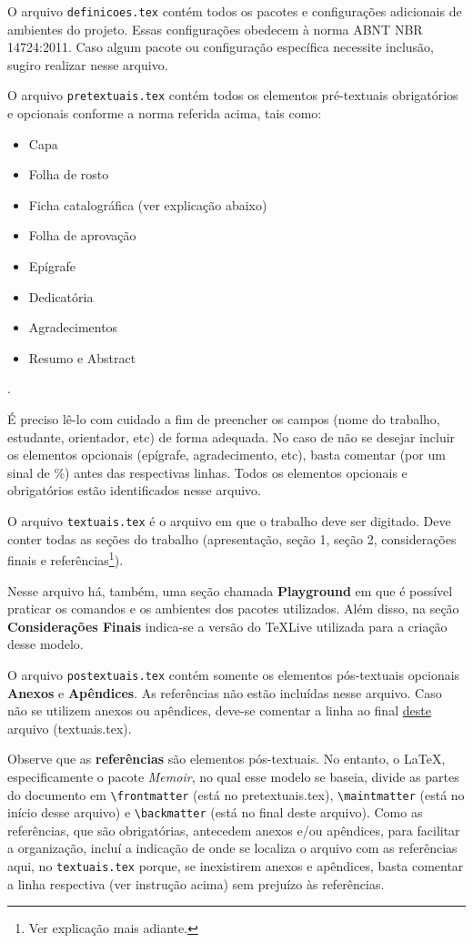 \documentclass[a4paper,12pt,oneside,openright,extrafontsizes,openbib]{memoir}
\begin{document}
{O arquivo \verb|definicoes.tex| contém todos os pacotes e configurações adicionais de ambientes do projeto. Essas configurações obedecem à norma ABNT NBR 14724:2011. Caso algum pacote ou configuração específica necessite inclusão, sugiro realizar nesse arquivo.

O arquivo \verb|pretextuais.tex| contém todos os elementos pré-textuais obrigatórios e opcionais conforme a norma referida acima, tais como:

\begin{itemize}
	\item Capa
	\item Folha de rosto
	\item Ficha catalográfica (ver explicação abaixo)
	\item Folha de aprovação
	\item Epígrafe
	\item Dedicatória
	\item Agradecimentos
	\item Resumo e Abstract
\end{itemize}. 

É preciso lê-lo com cuidado a fim de preencher os campos (nome do trabalho, estudante, orientador, etc) de forma adequada. No caso de não se desejar incluir os elementos opcionais (epígrafe, agradecimento, etc), basta comentar (por um sinal de \%) antes das respectivas linhas. Todos os elementos opcionais e obrigatórios estão identificados nesse arquivo.

O arquivo \verb|textuais.tex| é o arquivo em que o trabalho deve ser digitado. Deve conter todas as seções do trabalho (apresentação, seção 1, seção 2, considerações finais e referências\footnote{Ver explicação mais adiante.}).

Nesse arquivo há, também, uma seção chamada \textbf{Playground} em que é possível praticar os comandos e os ambientes dos pacotes utilizados. Além disso, na seção \textbf{Considerações Finais} indica-se a versão do \TeX Live utilizada para a criação desse modelo.

O arquivo \verb|postextuais.tex| contém somente os elementos pós-textuais opcionais \textbf{Anexos} e \textbf{Apêndices}. As referências não estão incluídas nesse arquivo. Caso não se utilizem anexos ou apêndices, deve-se comentar a linha \verb|| ao final \underline{deste} arquivo (textuais.tex).

Observe que as \textbf{referências} são elementos pós-textuais. No entanto, o \LaTeX, especificamente o pacote \textit{Memoir}, no qual esse modelo se baseia, divide as partes do documento em \verb|\frontmatter| (está no pretextuais.tex), \verb|\maintmatter| (está no início desse arquivo) e \verb|\backmatter| (está no final deste arquivo). Como as referências, que são obrigatórias, antecedem anexos e/ou apêndices, para facilitar a organização, incluí a indicação de onde se localiza o arquivo com as referências aqui, no \verb|textuais.tex| porque, se inexistirem anexos e apêndices, basta comentar a linha respectiva (ver instrução acima) sem prejuízo às referências.

}
\end{document}
